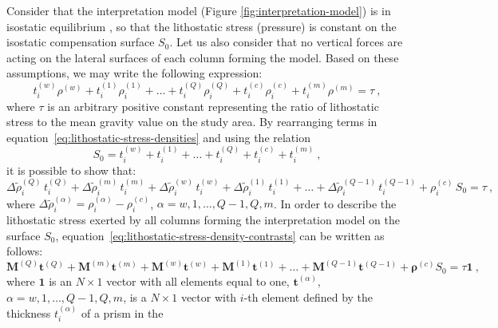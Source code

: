 \documentclass[manuscript]{geophysics}
\begin{document}
Consider that the interpretation model (Figure \ref{fig:interpretation-model})
is in isostatic equilibrium \citep{turcotte-schubert2002, hofmann-wellenhof-moritz2005, 
lowrie2007}, so that the lithostatic stress (pressure) is constant on the isostatic 
compensation surface $S_{0}$.
Let us also consider that no vertical forces are acting on the lateral surfaces of 
each column forming the model.
Based on these assumptions, we may write the following expression:
\begin{equation}
t^{(w)}_{i} \rho^{(w)} + t^{(1)}_{i} \rho^{(1)}_{i} + \dots + 
t^{(Q)}_{i} \rho^{(Q)}_{i} + t^{(c)}_{i} \rho^{(c)}_{i} + t^{(m)}_{i} \rho^{(m)} 
= \tau \: ,
\label{eq:lithostatic-stress-densities}
\end{equation}
where $\tau$ is an arbitrary positive constant representing the ratio of
lithostatic stress to the mean gravity value on the study area.
By rearranging terms in equation~\ref{eq:lithostatic-stress-densities} 
and using the relation
\begin{equation}
S_{0} = t^{(w)}_{i} + t^{(1)}_{i} + \dots + t^{(Q)}_{i} + t^{(c)}_{i} + t^{(m)}_{i} \: ,
\label{eq:S0}
\end{equation}
it is possible to show that:
\begin{equation}
\Delta \tilde{\rho}^{(Q)}_{i} \, t^{(Q)}_{i} + 
\Delta \tilde{\rho}^{(m)}_{i} \, t^{(m)}_{i} + 
\Delta \tilde{\rho}^{(w)}_{i} \, t^{(w)}_{i} + 
\Delta \tilde{\rho}^{(1)}_{i} \, t^{(1)}_{i} +
\dots + 
\Delta \tilde{\rho}^{(Q-1)}_{i} \, t^{(Q-1)}_{i} +
\rho^{(c)}_{i} \, S_{0} = \tau \: ,
\label{eq:lithostatic-stress-density-contrasts}
\end{equation}
where $\Delta \tilde{\rho}^{(\alpha)}_{i} = \rho^{(\alpha)}_{i} - \rho^{(c)}_{i}$, 
$\alpha = w, 1, \dots, Q-1, Q, m$.
In order to describe the lithostatic stress exerted by all columns forming the
interpretation model on the surface $S_{0}$, 
equation~\ref{eq:lithostatic-stress-density-contrasts} 
can be written as follows:
\begin{equation}
\mathbf{M}^{(Q)} \mathbf{t}^{(Q)} + \mathbf{M}^{(m)} \mathbf{t}^{(m)} + \mathbf{M}^{(w)}
\mathbf{t}^{(w)} + \mathbf{M}^{(1)} \mathbf{t}^{(1)} + \dots + \mathbf{M}^{(Q-1)}
\mathbf{t}^{(Q-1)} + \boldsymbol{\rho}^{(c)} S_{0} = \tau \mathbf{1} \: ,
\label{eq:lithostatic-stress-matrix}
\end{equation}
where $\mathbf{1}$ is an $N \times 1$ vector with all elements equal to one, 
$\mathbf{t}^{(\alpha)}$, $\alpha = w, 1, \dots, Q-1, Q, m$, is a $N \times 1$ vector
with $i$-th element defined by the thickness $t^{(\alpha)}_{i}$ of a prism in the
\end{document}
